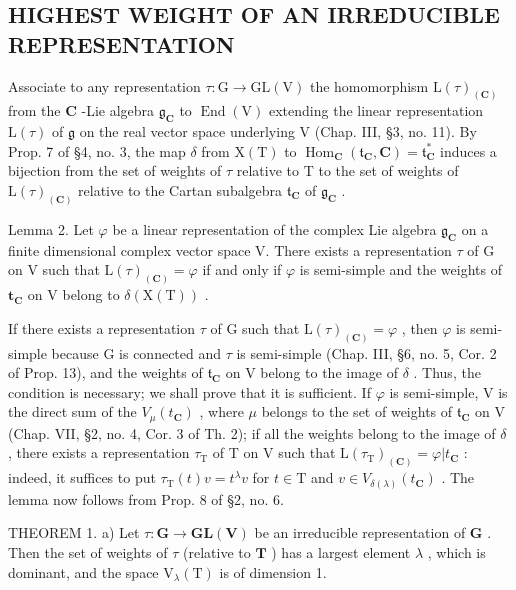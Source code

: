 \subsection{HIGHEST WEIGHT OF AN IRREDUCIBLE REPRESENTATION}

Associate to any representation \(\tau : \mathrm{G} \to \mathrm{GL}(\mathrm{V})\) the homomorphism \(\mathrm{L}(\tau)_{(\mathbf{C})}\) from the \(\mathbf{C}\) -Lie algebra \(\mathfrak{g}_{\mathbf{C}}\) to \(\operatorname{End}(\mathrm{V})\) extending the linear representation \(\mathrm{L}(\tau)\) of \(\mathfrak{g}\) on the real vector space underlying V (Chap. III, §3, no. 11). By Prop. 7 of §4, no. 3, the map \(\delta\) from \(\mathrm{X}(\mathrm{T})\) to \(\operatorname{Hom}_{\mathbf{C}}(\mathfrak{t}_{\mathbf{C}}, \mathbf{C}) = \mathfrak{t}_{\mathbf{C}}^{*}\) induces a bijection from the set of weights of \(\tau\) relative to T to the set of weights of \(\mathrm{L}(\tau)_{(\mathbf{C})}\) relative to the Cartan subalgebra \(\mathfrak{t}_{\mathbf{C}}\) of \(\mathfrak{g}_{\mathbf{C}}\) .

Lemma 2. Let \(\varphi\) be a linear representation of the complex Lie algebra \(\mathfrak{g}_{\mathbf{C}}\) on a finite dimensional complex vector space V. There exists a representation \(\tau\) of G on V such that \(\mathrm{L}(\tau)_{(\mathbf{C})} = \varphi\) if and only if \(\varphi\) is semi-simple and the weights of \(\mathbf{t}_{\mathbf{C}}\) on V belong to \(\delta (\mathrm{X(T)})\) .

If there exists a representation \(\tau\) of G such that \(\mathrm{L}(\tau)_{(\mathbf{C})} = \varphi\) , then \(\varphi\) is semi-simple because G is connected and \(\tau\) is semi-simple (Chap. III, §6, no. 5, Cor. 2 of Prop. 13), and the weights of \(\mathfrak{t}_{\mathbf{C}}\) on V belong to the image of \(\delta\) . Thus, the condition is necessary; we shall prove that it is sufficient. If \(\varphi\) is semi-simple, V is the direct sum of the \(V_{\mu}(t_{\mathbf{C}})\) , where \(\mu\) belongs to the set of weights of \(\mathfrak{t}_{\mathbf{C}}\) on V (Chap. VII, §2, no. 4, Cor. 3 of Th. 2); if all the weights belong to the image of \(\delta\) , there exists a representation \(\tau_{\mathrm{T}}\) of T on V such that \(\mathrm{L}(\tau_{\mathrm{T}})_{(\mathbf{C})} = \varphi |t_{\mathbf{C}}\) : indeed, it suffices to put \(\tau_{\mathrm{T}}(t)v = t^{\lambda}v\) for \(t \in \mathrm{T}\) and \(v \in V_{\delta(\lambda)}(t_{\mathbf{C}})\) . The lemma now follows from Prop. 8 of §2, no. 6.

THEOREM 1. a) Let \(\tau : \mathbf{G} \to \mathbf{GL}(\mathbf{V})\) be an irreducible representation of \(\mathbf{G}\) . Then the set of weights of \(\tau\) (relative to \(\mathbf{T}\) ) has a largest element \(\lambda\) , which is dominant, and the space \(\mathrm{V}_{\lambda}(\mathrm{T})\) is of dimension 1.

